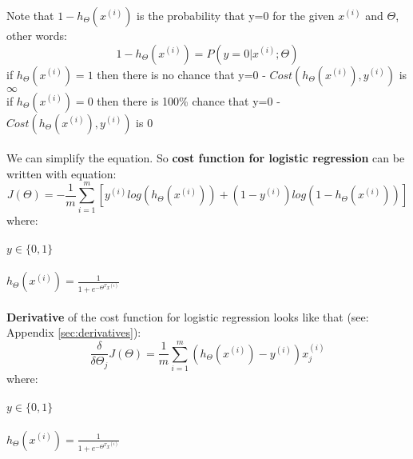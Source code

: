 \documentclass{article} %
\begin{document}
Note that $1-h_{\Theta}(x^{(i)})$ is the probability that y=0 for the given $x^{(i)}$ and $\Theta$, other words:
\begin{equation}
1-h_{\Theta}(x^{(i)}) = P( y=0 | x^{(i)};\Theta )
\end{equation}
if $h_{\Theta}(x^{(i)}) = 1$ then there is no chance that y=0 - $Cost(h_{\Theta}(x^{(i)}),y^{(i)})$ is $\infty$\\
if $h_{\Theta}(x^{(i)}) = 0$ then there is 100\% chance that y=0 - $Cost(h_{\Theta}(x^{(i)}),y^{(i)})$ is 0\\
\\
We can simplify the equation. So \textbf{cost function for logistic regression} can be written with equation:
\begin{equation}
J(\Theta) = - \frac{1}{m}\sum_{i=1}^{m}[y^{(i)}log(h_{\Theta}(x^{(i)}))+(1-y^{(i)})log(1-h_{\Theta}(x^{(i)}))] 
\end{equation}
where:\\
\\
$y\in\{0,1\}$ \\
\\
$h_\Theta(x^{(i)}) = \frac{1}{1+e^{-{\Theta^Tx^{(i)}}}}$\\
\\
\textbf{Derivative} of the cost function for logistic regression looks like that (see: Appendix \ref{sec:derivatives}):
\newline
\begin{equation}
\frac{\delta}{\delta\Theta_j}J(\Theta) = \frac{1}{m} \sum_{i=1}^m (h_\Theta(x^{(i)}) - y^{(i)}) x_j^{(i)}
\end{equation}
where:\\
\\
$y\in\{0,1\}$ \\
\\
$h_\Theta(x^{(i)}) = \frac{1}{1+e^{-{\Theta^Tx^{(i)}}}}$\\
\\
\end{document}
